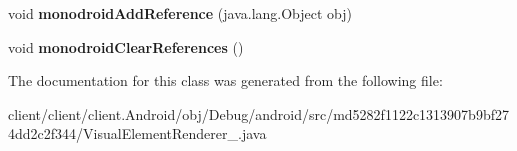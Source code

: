 \begin{DoxyCompactItemize}
\item 
\hypertarget{classmd5282f1122c1313907b9bf274dd2c2f344_1_1VisualElementRenderer__1_a566e323036828eab4905c9958d1221cf}{}void {\bfseries monodroid\+Add\+Reference} (java.\+lang.\+Object obj)\label{classmd5282f1122c1313907b9bf274dd2c2f344_1_1VisualElementRenderer__1_a566e323036828eab4905c9958d1221cf}

\item 
\hypertarget{classmd5282f1122c1313907b9bf274dd2c2f344_1_1VisualElementRenderer__1_a3c77616001d3f384c87ccbb4a8615989}{}void {\bfseries monodroid\+Clear\+References} ()\label{classmd5282f1122c1313907b9bf274dd2c2f344_1_1VisualElementRenderer__1_a3c77616001d3f384c87ccbb4a8615989}

\end{DoxyCompactItemize}


The documentation for this class was generated from the following file\+:\begin{DoxyCompactItemize}
\item 
client/client/client.\+Android/obj/\+Debug/android/src/md5282f1122c1313907b9bf274dd2c2f344/Visual\+Element\+Renderer\+\_.\+java\end{DoxyCompactItemize}

